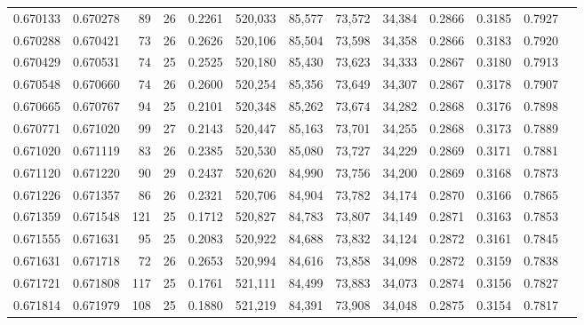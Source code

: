 \begin{tabular}{rrrrrrrrrrrrr}
0.670133 & 0.670278 &    89 &  26 &                                     0.2261 & 520,033 &  85,577 &  73,572 &  34,384 & 0.2866 & 0.3185 & 0.7927 \\
0.670288 & 0.670421 &    73 &  26 &                                     0.2626 & 520,106 &  85,504 &  73,598 &  34,358 & 0.2866 & 0.3183 & 0.7920 \\
0.670429 & 0.670531 &    74 &  25 &                                     0.2525 & 520,180 &  85,430 &  73,623 &  34,333 & 0.2867 & 0.3180 & 0.7913 \\
0.670548 & 0.670660 &    74 &  26 &                                     0.2600 & 520,254 &  85,356 &  73,649 &  34,307 & 0.2867 & 0.3178 & 0.7907 \\
0.670665 & 0.670767 &    94 &  25 &                                     0.2101 & 520,348 &  85,262 &  73,674 &  34,282 & 0.2868 & 0.3176 & 0.7898 \\
0.670771 & 0.671020 &    99 &  27 &                                     0.2143 & 520,447 &  85,163 &  73,701 &  34,255 & 0.2868 & 0.3173 & 0.7889 \\
0.671020 & 0.671119 &    83 &  26 &                                     0.2385 & 520,530 &  85,080 &  73,727 &  34,229 & 0.2869 & 0.3171 & 0.7881 \\
0.671120 & 0.671220 &    90 &  29 &                                     0.2437 & 520,620 &  84,990 &  73,756 &  34,200 & 0.2869 & 0.3168 & 0.7873 \\
0.671226 & 0.671357 &    86 &  26 &                                     0.2321 & 520,706 &  84,904 &  73,782 &  34,174 & 0.2870 & 0.3166 & 0.7865 \\
0.671359 & 0.671548 &   121 &  25 &                                     0.1712 & 520,827 &  84,783 &  73,807 &  34,149 & 0.2871 & 0.3163 & 0.7853 \\
0.671555 & 0.671631 &    95 &  25 &                                     0.2083 & 520,922 &  84,688 &  73,832 &  34,124 & 0.2872 & 0.3161 & 0.7845 \\
0.671631 & 0.671718 &    72 &  26 &                                     0.2653 & 520,994 &  84,616 &  73,858 &  34,098 & 0.2872 & 0.3159 & 0.7838 \\
0.671721 & 0.671808 &   117 &  25 &                                     0.1761 & 521,111 &  84,499 &  73,883 &  34,073 & 0.2874 & 0.3156 & 0.7827 \\
0.671814 & 0.671979 &   108 &  25 &                                     0.1880 & 521,219 &  84,391 &  73,908 &  34,048 & 0.2875 & 0.3154 & 0.7817 \\

\end{tabular}
